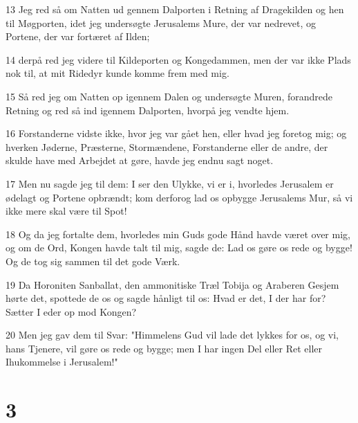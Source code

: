 \par 13 Jeg red så om Natten ud gennem Dalporten i Retning af Dragekilden og hen til Møgporten, idet jeg undersøgte Jerusalems Mure, der var nedrevet, og Portene, der var fortæret af Ilden;
\par 14 derpå red jeg videre til Kildeporten og Kongedammen, men der var ikke Plads nok til, at mit Ridedyr kunde komme frem med mig.
\par 15 Så red jeg om Natten op igennem Dalen og undersøgte Muren, forandrede Retning og red så ind igennem Dalporten, hvorpå jeg vendte hjem.
\par 16 Forstanderne vidste ikke, hvor jeg var gået hen, eller hvad jeg foretog mig; og hverken Jøderne, Præsterne, Stormændene, Forstanderne eller de andre, der skulde have med Arbejdet at gøre, havde jeg endnu sagt noget.
\par 17 Men nu sagde jeg til dem: I ser den Ulykke, vi er i, hvorledes Jerusalem er ødelagt og Portene opbrændt; kom derforog lad os opbygge Jerusalems Mur, så vi ikke mere skal være til Spot!
\par 18 Og da jeg fortalte dem, hvorledes min Guds gode Hånd havde været over mig, og om de Ord, Kongen havde talt til mig, sagde de: Lad os gøre os rede og bygge! Og de tog sig sammen til det gode Værk.
\par 19 Da Horoniten Sanballat, den ammonitiske Træl Tobija og Araberen Gesjem hørte det, spottede de os og sagde hånligt til os: Hvad er det, I der har for? Sætter I eder op mod Kongen?
\par 20 Men jeg gav dem til Svar: "Himmelens Gud vil lade det lykkes for os, og vi, hans Tjenere, vil gøre os rede og bygge; men I har ingen Del eller Ret eller Ihukommelse i Jerusalem!"

\chapter{3}

